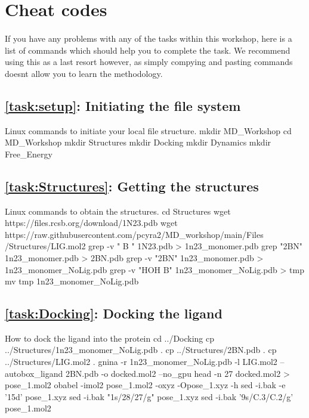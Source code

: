 \newpage
\section{Cheat codes}
    \paragraph{}
    If you have any problems with any of the tasks within this workshop, here is a list of commands which should help you to complete the task. We recommend using this as a last resort however,
    as simply compying and pasting commands doesnt allow you to learn the methodology. 

    \subsection{\cref{task:setup}: Initiating the file system}
    \begin{bashcmd}[label=cmd:task1]{Linux commands to initiate your local file structure.}
    mkdir MD_Workshop
    cd MD_Workshop
    mkdir Structures
    mkdir Docking
    mkdir Dynamics
    mkdir Free_Energy
    \end{bashcmd}
    
    \subsection{\cref{task:Structures}: Getting the structures}
    \begin{bashcmd}[label=cmd:task2]{Linux commands to obtain the structures.}
    cd Structures
    wget https://files.rcsb.org/download/1N23.pdb
    wget https://raw.githubusercontent.com/pcyra2/MD_workshop/main/Files /Structures/LIG.mol2
    grep -v " B " 1N23.pdb > 1n23_monomer.pdb
    grep "2BN" 1n23_monomer.pdb > 2BN.pdb
    grep -v "2BN" 1n23_monomer.pdb > 1n23_monomer_NoLig.pdb  
    grep -v "HOH B" 1n23_monomer_NoLig.pdb > tmp
    mv tmp 1n23_monomer_NoLig.pdb
    \end{bashcmd}

    \subsection{\cref{task:Docking}: Docking the ligand}
    \begin{bashcmd}[label=cmd:task3]{How to dock the ligand into the protein}
    cd ../Docking
    cp ../Structures/1n23_monomer_NoLig.pdb .
    cp ../Structures/2BN.pdb .
    cp ../Structures/LIG.mol2 .
    gnina -r 1n23_monomer_NoLig.pdb -l LIG.mol2 --autobox_ligand 2BN.pdb -o docked.mol2 --no_gpu
    head -n 27 docked.mol2 > pose_1.mol2
    obabel -imol2 pose_1.mol2 -oxyz -Opose_1.xyz -h
    sed -i.bak -e '15d' pose_1.xyz 
    sed -i.bak "1s/28/27/g" pose_1.xyz
    sed -i.bak '9s/C.3/C.2/g' pose_1.mol2
    \end{bashcmd}

